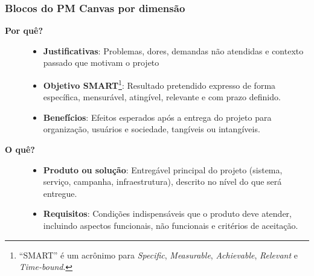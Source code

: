         \subsubsection*{Blocos do PM Canvas por dimensão}
            \begin{description}
                \item[\textbf{Por quê?}] 
                \begin{itemize}
                    \item \textbf{Justificativas}: Problemas, dores, demandas não atendidas e contexto passado que motivam o projeto
                    \item \textbf{Objetivo SMART}\footnote{``SMART'' é um acrônimo para \textit{Specific}, \textit{Measurable}, \textit{Achievable}, \textit{Relevant} e \textit{Time-bound}.}: Resultado pretendido expresso de forma específica, mensurável, atingível, relevante e com prazo definido.
                    \item \textbf{Benefícios}: Efeitos esperados após a entrega do projeto para organização, usuários e sociedade, tangíveis ou intangíveis.
                \end{itemize}
                \item[\textbf{O quê?}] 
                \begin{itemize}
                    \item \textbf{Produto ou solução}: Entregável principal do projeto (sistema, serviço, campanha, infraestrutura), descrito no nível do que será entregue.
                    \item \textbf{Requisitos}: Condições indispensáveis que o produto deve atender, incluindo aspectos funcionais, não funcionais e critérios de aceitação.
                \end{itemize}


\end{description}
